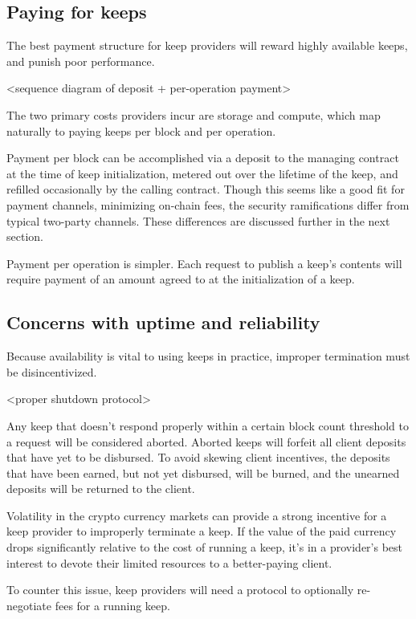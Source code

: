 \documentclass[11pt]{article}
\begin{document}
\subsection{Paying for keeps}

The best payment structure for keep providers will reward highly
available keeps, and punish poor performance.

<sequence diagram of deposit + per-operation payment>

The two primary costs providers incur are storage and compute, which
map naturally to paying keeps per block and per operation.

Payment per block can be accomplished via a deposit to the managing
contract at the time of keep initialization, metered out over the
lifetime of the keep, and refilled occasionally by the calling
contract. Though this seems like a good fit for payment channels,
minimizing on-chain fees, the security ramifications differ from
typical two-party channels. These differences are discussed further in
the next section.

Payment per operation is simpler. Each request to publish a keep’s
contents will require payment of an amount agreed to at the
initialization of a keep.

\subsection{Concerns with uptime and reliability} \label{uptime}

Because availability is vital to using keeps in practice, improper
termination must be disincentivized.

<proper shutdown protocol>

Any keep that doesn’t respond properly within a certain block count
threshold to a request will be considered aborted. Aborted keeps will
forfeit all client deposits that have yet to be disbursed. To avoid
skewing client incentives, the deposits that have been earned, but not
yet disbursed, will be burned, and the unearned deposits will be
returned to the client.

Volatility in the crypto currency markets can provide a strong
incentive for a keep provider to improperly terminate a keep. If the
value of the paid currency drops significantly relative to the cost of
running a keep, it’s in a provider’s best interest to devote their
limited resources to a better-paying client.

To counter this issue, keep providers will need a protocol to
optionally re-negotiate fees for a running keep.
\end{document}
